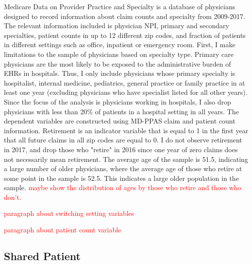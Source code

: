 \documentclass[11pt]{article}
\begin{document}
Medicare Data on Provider Practice and Specialty is a database of physicians designed to record information about claim counts and specialty from 2009-2017. The relevant information included is physician NPI, primary and secondary specialties, patient counts in up to 12 different zip codes, and fraction of patients in different settings such as office, inpatient or emergency room. First, I make limitations to the sample of physicians based on specialty type. Primary care physicians are the most likely to be exposed to the administrative burden of EHRs in hospitals. Thus, I only include physicians whose primary specialty is hospitalist, internal medicine, pediatrics, general practice or family practice in at least one year (excluding physicians who have specialist listed for all other years). Since the focus of the analysis is physicians working in hospitals, I also drop physicians with less than 20\% of patients in a hospital setting in all years. 
The dependent variables are constructed using MD-PPAS claim and patient count information. Retirement is an indicator variable that is equal to 1 in the first year that all future claims in all zip codes are equal to 0. I do not observe retirement in 2017, and drop those who "retire" in 2016 since one year of zero claims does not necessarily mean retirement. The average age of the sample is 51.5, indicating a large number of older physicians, where the average age of those who retire at some point in the sample is 52.5. This indicates a large older population in the sample. \textcolor{red}{maybe show the distribution of ages by those who retire and those who don't.}

\textcolor{red}{paragraph about switching setting variables}

\textcolor{red}{paragraph about patient count variable}

\subsection{Shared Patient}
\end{document}
